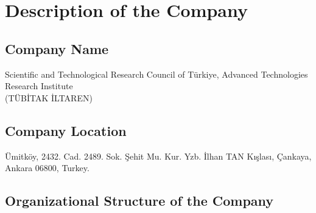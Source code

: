\documentclass[12pt]{report}
\begin{document}

    
    
    

    
    



\tableofcontents
\listoffigures
\listoftables

\chapter{Description of the Company}

    \section{Company Name}
    Scientific and Technological Research Council of Türkiye, Advanced Technologies Research Institute \\
    (TÜBİTAK İLTAREN)
    \section{Company Location}
    Ümitköy, 2432. Cad. 2489. Sok. Şehit Mu. Kur. Yzb. İlhan TAN Kışlası,
    Çankaya, Ankara 06800,
    Turkey.
    \section{Organizational Structure of the Company}
\end{document}
